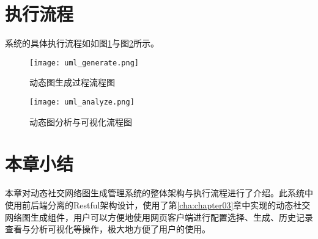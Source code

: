 \section{执行流程}





系统的具体执行流程如如图\ref{fig:uml_generate}与图\ref{fig:uml_analyze}所示。

\begin{figure}[H]
  \centering
  \texttt{[image: uml\_generate.png]}
  \caption{动态图生成过程流程图}
  \label{fig:uml_generate}
\end{figure}

\begin{figure}[H]
  \centering
  \texttt{[image: uml\_analyze.png]}
  \caption{动态图分析与可视化流程图}
  \label{fig:uml_analyze}
\end{figure}

\section{本章小结}

本章对动态社交网络图生成管理系统的整体架构与执行流程进行了介绍。此系统中使用前后端分离的Restful架构设计，使用了第\ref{cha:chapter03}章中实现的动态社交网络图生成组件，用户可以方便地使用网页客户端进行配置选择、生成、历史记录查看与分析可视化等操作，极大地方便了用户的使用。